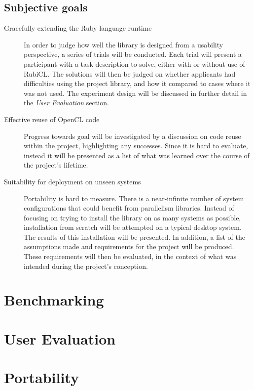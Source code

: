\subsection{Subjective goals}
\begin{description}
\item[Gracefully extending the Ruby language runtime]
In order to judge how well the library is designed from a usability perspective, a series of trials will be conducted.
Each trial will present a participant with a task description to solve, either with or without use of RubiCL.
The solutions will then be judged on whether applicants had difficulties using the project library, and how it compared to cases where it was not used.
The experiment design will be discussed in further detail in the \emph{User Evaluation} section.
\item[Effective reuse of \ac{OpenCL} code]
Progress towards goal will be investigated by a discussion on code reuse within the project, highlighting any successes. Since it is hard to evaluate, instead it will be presented as a list of what was learned over the course of the project's lifetime.
\item[Suitability for deployment on unseen systems]
Portability is hard to measure. There is a near-infinite number of system configurations that could benefit from parallelism libraries. Instead of focusing on trying to install the library on as many systems as possible, installation from scratch will be attempted on a typical desktop system.  The results of this installation will be presented. In addition, a list of the assumptions made and requirements for the project will be produced. These requirements will then be evaluated, in the context of what was intended during the project's conception.
\end{description}

\section{Benchmarking}

\section{User Evaluation}

\section{Portability}
